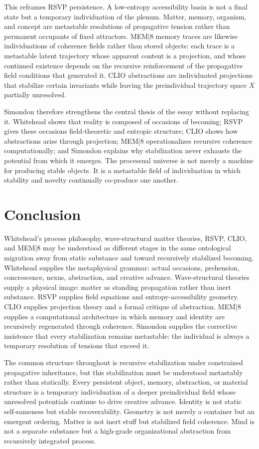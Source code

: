 \documentclass[12pt,a4paper]{article}
\begin{document}
This reframes RSVP persistence. A low-entropy accessibility basin is not a final state but a temporary individuation of the plenum. Matter, memory, organism, and concept are metastable resolutions of propagative tension rather than permanent occupants of fixed attractors. MEM|8 memory traces are likewise individuations of coherence fields rather than stored objects: each trace is a metastable latent trajectory whose apparent content is a projection, and whose continued existence depends on the recursive reinforcement of the propagative field conditions that generated it. CLIO abstractions are individuated projections that stabilize certain invariants while leaving the preindividual trajectory space \(X\) partially unresolved.

Simondon therefore strengthens the central thesis of the essay without replacing it. Whitehead shows that reality is composed of occasions of becoming; RSVP gives these occasions field-theoretic and entropic structure; CLIO shows how abstractions arise through projection; MEM|8 operationalizes recursive coherence computationally; and Simondon explains why stabilization never exhausts the potential from which it emerges. The processual universe is not merely a machine for producing stable objects. It is a metastable field of individuation in which stability and novelty continually co-produce one another.

\section{Conclusion}

Whitehead's process philosophy, wave-structural matter theories, RSVP, CLIO, and MEM|8 may be understood as different stages in the same ontological migration away from static substance and toward recursively stabilized becoming. Whitehead supplies the metaphysical grammar: actual occasions, prehension, concrescence, nexus, abstraction, and creative advance. Wave-structural theories supply a physical image: matter as standing propagation rather than inert substance. RSVP supplies field equations and entropy-accessibility geometry. CLIO supplies projection theory and a formal critique of abstraction. MEM|8 supplies a computational architecture in which memory and identity are recursively regenerated through coherence. Simondon supplies the corrective insistence that every stabilization remains metastable: the individual is always a temporary resolution of tensions that exceed it.

The common structure throughout is recursive stabilization under constrained propagative inheritance, but this stabilization must be understood metastably rather than statically. Every persistent object, memory, abstraction, or material structure is a temporary individuation of a deeper preindividual field whose unresolved potentials continue to drive creative advance. Identity is not static self-sameness but stable recoverability. Geometry is not merely a container but an emergent ordering. Matter is not inert stuff but stabilized field coherence. Mind is not a separate substance but a high-grade organizational abstraction from recursively integrated process.
\end{document}
